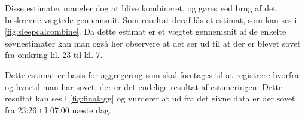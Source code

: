 Disse estimater mangler dog at blive kombineret, og gøres ved brug af det beskrevne vægtede gennemsnit.
Som resultat deraf fås et estimat, som kan ses i \cref{fig:sleepcalcombine}.
Da dette estimat er et vægtet gennemsnit af de enkelte søvnestimater kan man også her observere at det ser ud til at der er blevet sovet fra omkring kl. 23 til kl. 7.

Dette estimat er basis for aggregering som skal foretages til at registrere hvorfra og hvortil man har sovet, der er det endelige resultat af estimeringen.
Dette resultat kan ses i \cref{fig:finalagg} og vurderer at ud fra det givne data er der sovet fra 23:26 til 07:00 næste dag.
